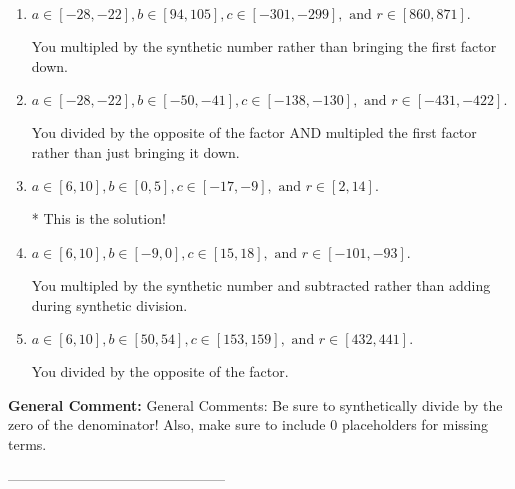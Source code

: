 \documentclass{extbook}[14pt]
\begin{document}
\begin{enumerate}[label=\Alph*.] 
\item $ a \in [-28, -22], b \in [94, 105], c \in [-301, -299], \text{ and } r \in [860, 871]. $ 

  You multipled by the synthetic number rather than bringing the first factor down. 
\item $ a \in [-28, -22], b \in [-50, -41], c \in [-138, -130], \text{ and } r \in [-431, -422]. $ 

  You divided by the opposite of the factor AND multipled the first factor rather than just bringing it down. 
\item $ a \in [6, 10], b \in [0, 5], c \in [-17, -9], \text{ and } r \in [2, 14]. $ 

 * This is the solution! 
\item $ a \in [6, 10], b \in [-9, 0], c \in [15, 18], \text{ and } r \in [-101, -93]. $ 

  You multipled by the synthetic number and subtracted rather than adding during synthetic division. 
\item $ a \in [6, 10], b \in [50, 54], c \in [153, 159], \text{ and } r \in [432, 441]. $ 

  You divided by the opposite of the factor. 
\end{enumerate} 
 
\textbf{General Comment:} General Comments: Be sure to synthetically divide by the zero of the denominator! Also, make sure to include 0 placeholders for missing terms. 

-----------------------------------------------
\end{document}
